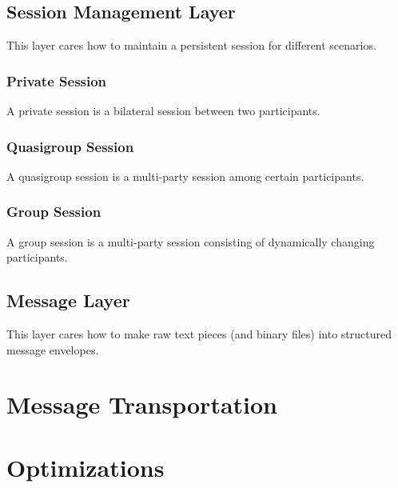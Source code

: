 
\subsection{Session Management Layer}

This layer cares how to maintain a persistent session for different scenarios.

\subsubsection{Private Session}

A private session is a bilateral session between two participants.

\subsubsection{Quasigroup Session}

A quasigroup session is a multi-party session among certain participants.

\subsubsection{Group Session}

A group session is a multi-party session consisting of dynamically changing participants.

\subsection{Message Layer}

This layer cares how to make raw text pieces (and binary files) into structured message envelopes.










\section{Message Transportation}










\section{Optimizations}







